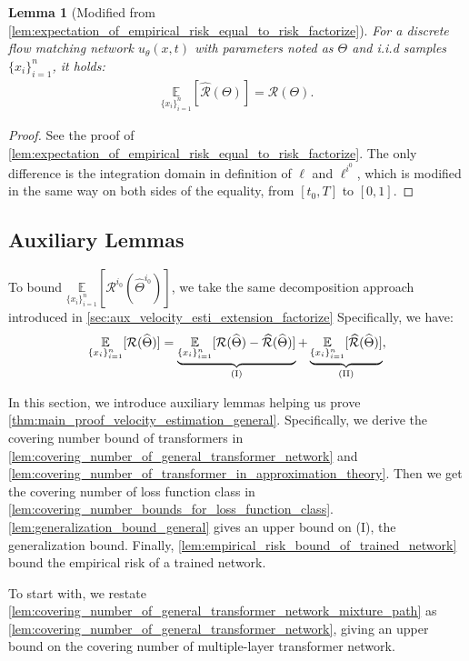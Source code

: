\documentclass[12pt]{article}
\numberwithin{equation}{section}
\let\hat\widehat
\newcommand{\wh}{\widehat}
\renewcommand{\hat}{\wh}
\DeclareMathOperator*{\E}{{\mathbb{E}}}
\def\E{\mathbb{E}}
\theoremstyle{theoremstyle}
\newtheorem{lemma}{Lemma}[section]
\numberwithin{equation}{section}
\numberwithin{theorem}{section}
\numberwithin{proposition}{section}
\numberwithin{definition}{section}
\numberwithin{lemma}{section}
\numberwithin{assumption}{section}
\numberwithin{remark}{section}
\begin{document}
\begin{lemma}[Modified from \cref{lem:expectation_of_empirical_risk_equal_to_risk_factorize}]\label{lem:expectation_of_empirical_risk_equal_to_risk}
For a discrete flow matching network $u_\theta(x,t)$ with parameters noted as $\Theta$ and i.i.d samples $\{x_i\}_{i=1}^n$, it holds:
\begin{align*}
    \underset{\{x_i\}_{i=1}^n}{\E}[\hat{\mathcal{R}}(\Theta)]=\mathcal{R}(\Theta).
    \end{align*}
\end{lemma}

\begin{proof}
See the proof of \cref{lem:expectation_of_empirical_risk_equal_to_risk_factorize}.
The only difference is the integration domain in definition of $\ell$ and $\ell^{i^0}$, which is modified in the same way on both sides of the equality, from $[t_0,T]$ to $[0,1]$.
\end{proof}

\subsection{Auxiliary Lemmas}
\label{sec:aux_velocity_esti_extension}
To bound $\underset{\{x_i\}_{i=1}^n}{\E}[\mathcal{R}^{i_0}(\hat{\Theta}^{i_0})]$, we take the same decomposition approach introduced in \cref{sec:aux_velocity_esti_extension_factorize}
Specifically, we have:
\begin{align}\label{eq:risk_decomposition}
    \underset{\{x_i\}_{i=1}^n}{\E}[\mathcal{R}(\hat{\Theta})]=\underbrace{\underset{\{x_i\}_{i=1}^n}{\E}[\mathcal{R}(\hat{\Theta})-\hat{\mathcal{R}}(\hat{\Theta})]}_{\rm (I)}+\underbrace{\underset{\{x_i\}_{i=1}^n}{\E}[\hat{\mathcal{R}}(\hat{\Theta})]}_{\rm (II)},
\end{align}

In this section, we introduce auxiliary lemmas helping us prove \cref{thm:main_proof_velocity_estimation_general}.
Specifically, we derive the covering number bound of transformers in \cref{lem:covering_number_of_general_transformer_network} and \cref{lem:covering_number_of_transformer_in_approximation_theory}.
Then we get the covering number of loss function class in \cref{lem:covering_number_bounds_for_loss_function_class}.
\cref{lem:generalization_bound_general} gives an upper bound on (I), the generalization bound.
Finally, \cref{lem:empirical_risk_bound_of_trained_network} bound the empirical risk of a trained network.

To start with, we restate \cref{lem:covering_number_of_general_transformer_network_mixture_path} as \cref{lem:covering_number_of_general_transformer_network}, giving an upper bound on the covering number of multiple-layer transformer network.
\end{document}
